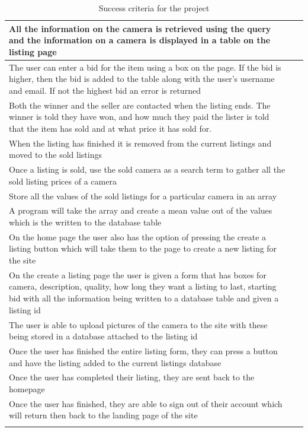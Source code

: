 \begin{center}
\begin{longtable}{|p{12.5cm}|p{15mm}|}
    All the information on the camera is retrieved using the query and the information on a camera is displayed in a table on the listing page & ~ \\ \hline
    The user can enter a bid for the item using a box on the page. If the bid is higher, then the bid is added to the table along with the user’s username and email. If not the highest bid an error is returned & ~ \\ \hline
    Both the winner and the seller are contacted when the listing ends. The winner is told they have won, and how much they paid the lister is told that the item has sold and at what price it has sold for. & ~ \\ \hline
    When the listing has finished it is removed from the current listings and moved to the sold listings & ~ \\ \hline
    Once a listing is sold, use the sold camera as a search term to gather all the sold listing prices of a camera & ~ \\ \hline
    Store all the values of the sold listings for a particular camera in an array & ~ \\ \hline
    A program will take the array and create a mean value out of the values which is the written to the database table & ~ \\ \hline
    On the home page the user also has the option of pressing the create a listing button which will take them to the page to create a new listing for the site & ~ \\ \hline
    On the create a listing page the user is given a form that has boxes for camera, description, quality, how long they want a listing to last, starting bid with all the information being written to a database table and given a listing id & ~ \\ \hline
    The user is able to upload pictures of the camera to the site with these being stored in a database attached to the listing id & ~ \\ \hline
    Once the user has finished the entire listing form, they can press a button and have the listing added to the current listings database & ~ \\ \hline
    Once the user has completed their listing, they are sent back to the homepage & ~ \\ \hline
    Once the user has finished, they are able to sign out of their account which will return then back to the landing page of the site & ~ \\ \hline
    \caption{Success criteria for the project}
\label{tab:success_criteria}
\end{longtable}
\end{center}
